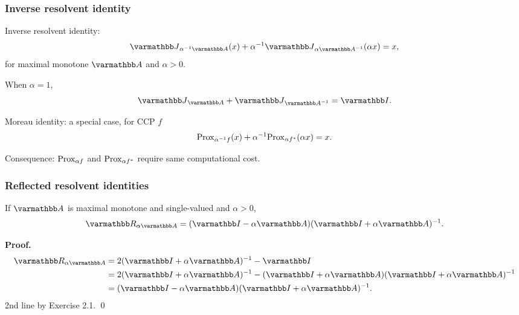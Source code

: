 \documentclass[10pt,mathserif]{beamer}
\begin{document}
\begin{frame}
\frametitle{Inverse resolvent identity}
Inverse resolvent identity:
\[
\opJ_{\alpha^{-1} \opA}(x)+\alpha^{-1}\opJ_{\alpha \opA^{-1}}(\alpha x)=x,
\]
for maximal monotone $\opA$ and $\alpha>0$.


\vspace{0.2in}
When $\alpha=1$,
\[
\opJ_{ \opA}+\opJ_{\opA^{-1}}=\opI.
\]

\vspace{0.2in}

Moreau identity: a special case, for CCP $f$
\[
\mathrm{Prox}_{\alpha^{-1}f}(x)+\alpha^{-1}\mathrm{Prox}_{\alpha f^*}(\alpha x)=x.
\]

\vspace{0.2in}

Consequence:
$\mathrm{Prox}_{\alpha f}$ and $\mathrm{Prox}_{\alpha f^*}$ require same computational cost.

\end{frame}

\begin{frame}
\frametitle{Reflected resolvent identities}
If $\opA$ is maximal monotone  and single-valued and $\alpha>0$,
\[
\opR_{\alpha \opA}=(\opI-\alpha \opA)(\opI+\alpha \opA)^{-1}.
\]
\vspace{0.2in}

\textbf{Proof.}
\begin{align*}
\opR_{\alpha \opA}&=2(\opI+\alpha \opA)^{-1}-\opI\\
&=
2(\opI+\alpha \opA)^{-1}-
(\opI+\alpha \opA)
(\opI+\alpha \opA)^{-1}\\
&=
(\opI-\alpha \opA)(\opI+\alpha \opA)^{-1}.
\end{align*}
2nd line by Exercise 2.1.
\qed
\end{frame}
\end{document}
